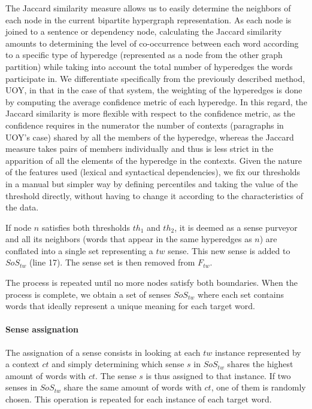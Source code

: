 The Jaccard similarity measure allows us to easily determine the neighbors of each node in the current bipartite hypergraph representation. As each node is joined to a sentence or dependency node, calculating the Jaccard similarity amounts to determining the level of co-occurrence between each word according to a specific type of hyperedge (represented as a node from the other graph partition) while taking into account the total number of hyperedges the words participate in. We differentiate specifically from the previously described method, UOY, in that in the case of that system, the weighting of the hyperedges is done by computing the average confidence metric of each hyperedge. In this regard, the Jaccard similarity is more flexible with respect to the confidence metric, as the confidence requires in the numerator the number of contexts (paragraphs in UOY's case) shared by all the members of the hyperedge, whereas the Jaccard measure takes pairs of members individually and thus is less strict in the apparition of all the elements of the hyperedge in the contexts. Given the nature of the features used (lexical and syntactical dependencies), we fix our thresholds in a manual but simpler way by defining percentiles and taking the value of the threshold directly, without having to change it according to the characteristics of the data.

If node $n$ satisfies both thresholds $th_1$ and $th_2$, it is deemed as a sense purveyor and all its neighbors (words that appear in the same hyperedges as $n$) are conflated into a single set representing a $tw$ sense. This new sense is added to $SoS_{tw}$ (line 17). The sense set is then removed from $F_{tw}$.

The process is repeated until no more nodes satisfy both boundaries. When the process is complete, we obtain a set of senses $SoS_{tw}$ where each set contains words that ideally represent a unique meaning for each target word. 

\paragraph{Sense assignation}

The assignation of a sense consists in looking at each $tw$ instance represented by a context $ct$ and simply determining which sense $s$ in $SoS_{tw}$ shares the highest amount of words with $ct$. The sense $s$ is thus assigned to that instance. If two senses in $SoS_{tw}$ share the same amount of words with $ct$, one of them is randomly chosen.  This operation is repeated for each instance of each target word. 



